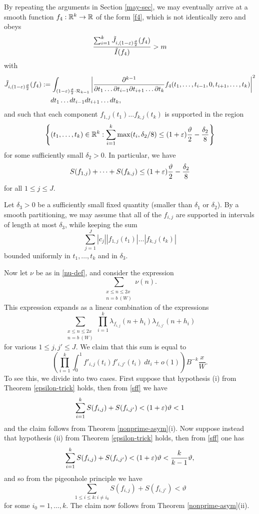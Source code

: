 By repeating the arguments in Section \ref{may-sec}, we may eventually arrive at a smooth function $f_4: \mathbb{R}^k \to \mathbb{R}$ of the form \eqref{f4}, which is not identically zero and obeys 
\begin{equation}\label{f4-ratio}
\frac{\sum_{i=1}^k \tilde J_{i,(1-\varepsilon) \frac{\vartheta}{2}}(f_4)}{\tilde I(f_4)} > m
\end{equation}
with
\begin{align*}
 \tilde J_{i, (1-\varepsilon) \frac{\vartheta}{2}}(f_4) &:= \int_{(1-\varepsilon) \frac{\vartheta}{2} \cdot {\mathcal R}_{k-1}} \left|\frac{\partial^{k-1}}{\partial t_1 \dots \partial t_{i-1} \partial t_{i+1} \dots \partial t_k} f_4(t_1,\dots,t_{i-1}, 0, t_{i+1}, \dots, t_k)\right|^2\\
&\quad \ dt_1 \dots dt_{i-1} dt_{i+1} \dots dt_k,
\end{align*}
and such that each component $f_{1,j}(t_1) \dots f_{k,j}(t_k)$ is supported in the region
$$ \left\{ (t_1,\dots,t_k) \in \mathbb{R}^k: \sum_{i=1}^k \max(t_i, \delta_2/8) \leq (1+\varepsilon) \frac{\vartheta}{2} - \frac{\delta_2}{8}\right\}$$
for some sufficiently small $\delta_2>0$.  In particular, we have
\begin{equation}\label{sff}
S(f_{1,j}) + \dots + S(f_{k,j}) \leq (1+\varepsilon) \frac{\vartheta}{2} - \frac{\delta_2}{8}
\end{equation}
for all $1 \leq j \leq J$.  

Let $\delta_3 > 0$ be a sufficiently small fixed quantity (smaller than $\delta_1$ or $\delta_2$).  By a smooth partitioning, we may assume that all of the $f_{i,j}$ are supported in intervals of length at most $\delta_3$, while keeping the sum
\begin{equation}\label{abs-sum}
\sum_{j=1}^J |c_j| |f_{1,j}(t_1)| \dots |f_{k,j}(t_k)|
\end{equation}
bounded uniformly in $t_1,\dots,t_k$ and in $\delta_3$.

Now let $\nu$ be as in \eqref{nu-def}, and consider the expression
$$ \sum_{\substack{x \leq n \leq 2x\\ n = b\ (W)}} \nu(n).$$
This expression expands as a linear combination of the expressions
$$ \sum_{\substack{x \leq n \leq 2x\\ n = b\ (W)}} \prod_{i=1}^k \lambda_{f_{i,j}}(n+h_i) \lambda_{f_{i,j'}}(n+h_i)$$
for various $1 \leq j,j' \leq J$.  We claim that this sum is equal to
$$ \left(\prod_{i=1}^k \int_0^1 f'_{i,j}(t_i) f'_{i,j'}(t_i)\ dt_i + o(1)\right) B^{-k} \frac{x}{W}.$$
To see this, we divide into two cases.  First suppose that hypothesis (i) from Theorem \ref{epsilon-trick} holds, then from \eqref{sff} we have
$$ \sum_{i=1}^k S(f_{i,j}) + S(f_{i,j'}) < (1+\varepsilon) \vartheta < 1$$
and the claim follows from Theorem \ref{nonprime-asym}(i).  Now suppose instead that hypothesis (ii) from Theorem \ref{epsilon-trick} holds, then from \eqref{sff} one has
$$ \sum_{i=1}^k S(f_{i,j}) + S(f_{i,j'}) < (1+\varepsilon) \vartheta < \frac{k}{k-1} \vartheta,$$
and so from the pigeonhole principle we have
$$ \sum_{1 \leq i \leq k: i \neq i_0} S(f_{i,j}) + S(f_{i,j'}) < \vartheta$$
for some $i_0 = 1,\ldots,k$.  The claim now follows from Theorem \ref{nonprime-asym}(ii).

